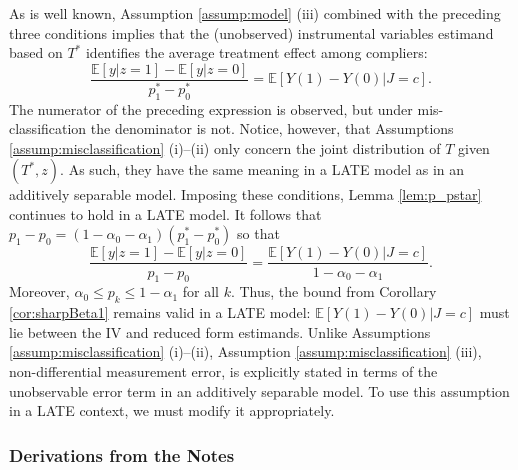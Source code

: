 As is well known, Assumption \ref{assump:model} (iii) combined with the preceding three conditions implies that the (unobserved) instrumental variables estimand based on $T^*$ identifies the average treatment effect among compliers:
\[
  \frac{\mathbb{E}[y|z=1] - \mathbb{E}[y|z=0]}{p^*_1 - p^*_0} = \mathbb{E}[Y(1) - Y(0)|J=c].
\]
The numerator of the preceding expression is observed, but under mis-classification the denominator is not.
Notice, however, that Assumptions \ref{assump:misclassification} (i)--(ii) only concern the joint distribution of $T$ given $(T^*,z)$.
As such, they have the same meaning in a LATE model as in an additively separable model.
Imposing these conditions, Lemma \ref{lem:p_pstar} continues to hold in a LATE model.
It follows that $p_1 - p_0 = (1 - \alpha_0 - \alpha_1) (p_1^* - p_0^*)$ so that
\[
  \frac{\mathbb{E}[y|z=1] - \mathbb{E}[y|z=0]}{p_1 - p_0} = \frac{\mathbb{E}[Y(1) - Y(0)|J=c]}{1 - \alpha_0 - \alpha_1}.
\]
Moreover, $\alpha_0 \leq p_k \leq 1 - \alpha_1$ for all $k$.
Thus, the bound from Corollary \ref{cor:sharpBeta1} remains valid in a LATE model: $\mathbb{E}[Y(1) - Y(0)|J=c]$ must lie between the IV and reduced form estimands.
Unlike Assumptions \ref{assump:misclassification} (i)--(ii), Assumption \ref{assump:misclassification} (iii), non-differential measurement error, is explicitly stated in terms of the unobservable error term in an additively separable model.
To use this assumption in a LATE context, we must modify it appropriately.




\subsubsection{Derivations from the Notes}

